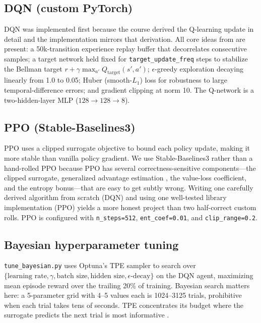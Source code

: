\documentclass[conference]{IEEEtran}
\newcommand{\code}[1]{\texttt{\small #1}}
\begin{document}
\subsection{DQN (custom PyTorch)}
DQN \cite{dqn-nature,dqn-atari} was implemented first because the course derived
the Q-learning update in detail and the implementation mirrors that derivation.
All core ideas from \cite{dqn-nature} are present: a 50k-transition experience
replay buffer that decorrelates consecutive samples; a target network held fixed
for \code{target\_update\_freq} steps to stabilize the Bellman target
$r + \gamma \max_{a'} Q_{\text{target}}(s',a')$; $\epsilon$-greedy exploration
decaying linearly from 1.0 to 0.05; Huber (smooth-$L_1$) loss for robustness to
large temporal-difference errors; and gradient clipping at norm 10. The
Q-network is a two-hidden-layer MLP ($128 \rightarrow 128 \rightarrow 8$).

\subsection{PPO (Stable-Baselines3)}
PPO \cite{ppo} uses a clipped surrogate objective to bound each policy update,
making it more stable than vanilla policy gradient. We use Stable-Baselines3
\cite{sb3} rather than a hand-rolled PPO because PPO has several
correctness-sensitive components---the clipped surrogate, generalized advantage
estimation \cite{gae}, the value-loss coefficient, and the entropy bonus---that
are easy to get subtly wrong. Writing one carefully derived algorithm from
scratch (DQN) and using one well-tested library implementation (PPO) yields a
more honest project than two half-correct custom rolls. PPO is configured with
\code{n\_steps=512}, \code{ent\_coef=0.01}, and \code{clip\_range=0.2}.

\subsection{Bayesian hyperparameter tuning}
\code{tune\_bayesian.py} uses Optuna's TPE sampler \cite{optuna} to search over
$\{\text{learning rate}, \gamma, \text{batch size}, \text{hidden size},
\epsilon\text{-decay}\}$ on the DQN agent, maximizing mean episode reward over
the trailing 20\% of training. Bayesian search matters here: a 5-parameter grid
with 4--5 values each is 1024--3125 trials, prohibitive when each trial takes
tens of seconds. TPE concentrates its budget where the surrogate predicts the
next trial is most informative \cite{optuna}.
\end{document}
